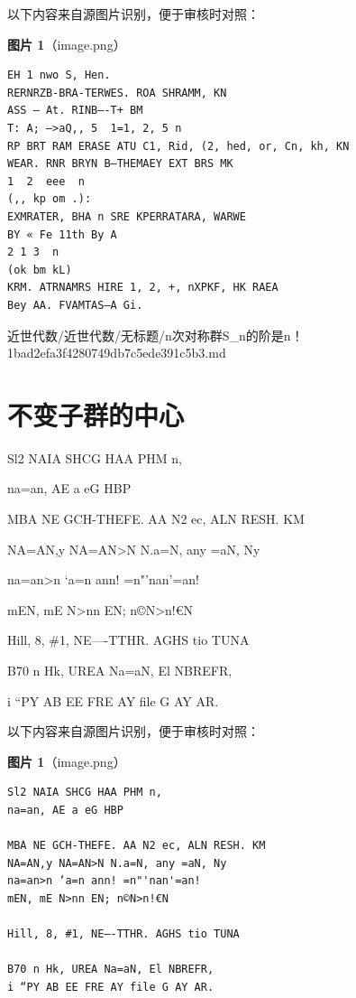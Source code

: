 \begin{note}
以下内容来自源图片识别，便于审核时对照：

\textbf{图片 1}（image.png）
\begin{Verbatim}[fontsize=\small]
EH 1 nwo S, Hen.
RERNRZB-BRA-TERWES. ROA SHRAMM, KN
ASS — At. RINB—-T+ BM
T: A; —>aQ,, 5  1=1, 2, 5 n
RP BRT RAM ERASE ATU C1, Rid, (2, hed, or, Cn, kh, KN
WEAR. RNR BRYN B—THEMAEY EXT BRS MK
1  2  eee  n
(,, kp om .):
EXMRATER, BHA n SRE KPERRATARA, WARWE
BY « Fe 11th By A
2 1 3  n
(ok bm kL)
KRM. ATRNAMRS HIRE 1, 2, +, nXPKF, HK RAEA
Bey AA. FVAMTAS—A Gi.
\end{Verbatim}

\end{note}

\begin{note}[来源路径]

近世代数/近世代数/无标题/n次对称群S\_n的阶是n！ 1bad2efa3f4280749db7c5ede391c5b3.md

\end{note}

\section*{不变子群的中心}

\begin{note}[不变子群的中心]

Sl2 NAIA SHCG HAA PHM n,

na=an, AE a eG HBP

MBA NE GCH-THEFE. AA N2 ec, ALN RESH. KM

NA=AN,y NA=AN>N N.a=N, any =aN, Ny

na=an>n ‘a=n ann! =n"'nan'=an!

mEN, mE N>nn EN; n©N>n!€N

Hill, 8, \#1, NE—-TTHR. AGHS tio TUNA

B70 n Hk, UREA Na=aN, El NBREFR,

i “PY AB EE FRE AY file G AY AR.

\end{note}

\begin{note}
以下内容来自源图片识别，便于审核时对照：

\textbf{图片 1}（image.png）
\begin{Verbatim}[fontsize=\small]
Sl2 NAIA SHCG HAA PHM n,
na=an, AE a eG HBP

MBA NE GCH-THEFE. AA N2 ec, ALN RESH. KM
NA=AN,y NA=AN>N N.a=N, any =aN, Ny
na=an>n ‘a=n ann! =n"'nan'=an!
mEN, mE N>nn EN; n©N>n!€N

Hill, 8, #1, NE—-TTHR. AGHS tio TUNA

B70 n Hk, UREA Na=aN, El NBREFR,
i “PY AB EE FRE AY file G AY AR.
\end{Verbatim}

\end{note}


